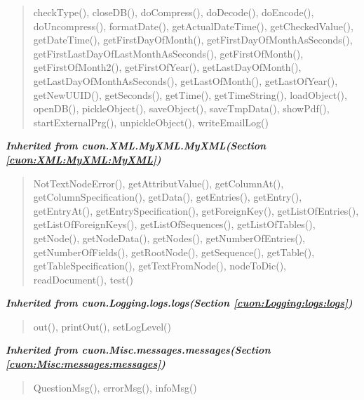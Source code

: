 \begin{quote}
checkType(), closeDB(), doCompress(), doDecode(), doEncode(), doUncompress(), formatDate(), getActualDateTime(), getCheckedValue(), getDateTime(), getFirstDayOfMonth(), getFirstDayOfMonthAsSeconds(), getFirstLastDayOfLastMonthAsSeconds(), getFirstOfMonth(), getFirstOfMonth2(), getFirstOfYear(), getLastDayOfMonth(), getLastDayOfMonthAsSeconds(), getLastOfMonth(), getLastOfYear(), getNewUUID(), getSeconds(), getTime(), getTimeString(), loadObject(), openDB(), pickleObject(), saveObject(), saveTmpData(), showPdf(), startExternalPrg(), unpickleObject(), writeEmailLog()
\end{quote}

\large{\textbf{\textit{Inherited from cuon.XML.MyXML.MyXML\textit{(Section \ref{cuon:XML:MyXML:MyXML})}}}}

\begin{quote}
NotTextNodeError(), getAttributValue(), getColumnAt(), getColumnSpecification(), getData(), getEntries(), getEntry(), getEntryAt(), getEntrySpecification(), getForeignKey(), getListOfEntries(), getListOfForeignKeys(), getListOfSequences(), getListOfTables(), getNode(), getNodeData(), getNodes(), getNumberOfEntries(), getNumberOfFields(), getRootNode(), getSequence(), getTable(), getTableSpecification(), getTextFromNode(), nodeToDic(), readDocument(), test()
\end{quote}

\large{\textbf{\textit{Inherited from cuon.Logging.logs.logs\textit{(Section \ref{cuon:Logging:logs:logs})}}}}

\begin{quote}
out(), printOut(), setLogLevel()
\end{quote}

\large{\textbf{\textit{Inherited from cuon.Misc.messages.messages\textit{(Section \ref{cuon:Misc:messages:messages})}}}}

\begin{quote}
QuestionMsg(), errorMsg(), infoMsg()
\end{quote}
